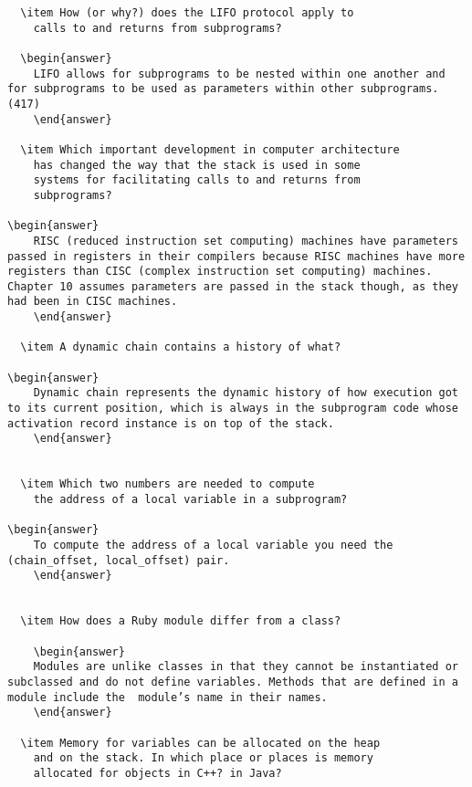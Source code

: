 \begin{enumerate}
\begin{answer}
\begin{lstlisting}
  \item How (or why?) does the LIFO protocol apply to
    calls to and returns from subprograms?
  
  \begin{answer}
    LIFO allows for subprograms to be nested within one another and for subprograms to be used as parameters within other subprograms. (417)
    \end{answer}

  \item Which important development in computer architecture
    has changed the way that the stack is used in some
    systems for facilitating calls to and returns from
    subprograms?

\begin{answer}
    RISC (reduced instruction set computing) machines have parameters passed in registers in their compilers because RISC machines have more registers than CISC (complex instruction set computing) machines. Chapter 10 assumes parameters are passed in the stack though, as they had been in CISC machines.
    \end{answer}

  \item A dynamic chain contains a history of what?

\begin{answer}
    Dynamic chain represents the dynamic history of how execution got to its current position, which is always in the subprogram code whose activation record instance is on top of the stack.
    \end{answer}
 

  \item Which two numbers are needed to compute
    the address of a local variable in a subprogram?

\begin{answer}
    To compute the address of a local variable you need the (chain_offset, local_offset) pair.
    \end{answer}


  \item How does a Ruby module differ from a class?

    \begin{answer}
    Modules are unlike classes in that they cannot be instantiated or subclassed and do not define variables. Methods that are defined in a module include the  module’s name in their names.
    \end{answer}

  \item Memory for variables can be allocated on the heap
    and on the stack. In which place or places is memory
    allocated for objects in C++? in Java?


\end{lstlisting}
\end{answer}
\end{enumerate}
